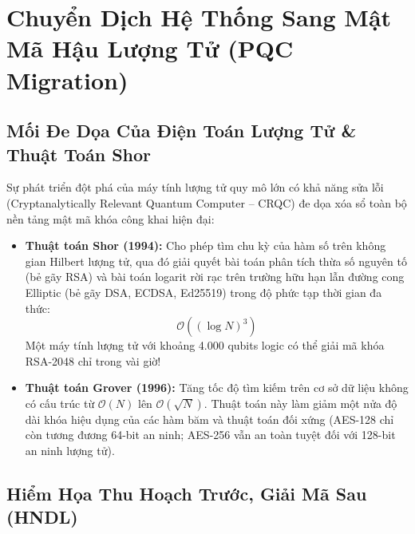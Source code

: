 \chapter{Chuyển Dịch Hệ Thống Sang Mật Mã Hậu Lượng Tử (PQC Migration)}


\section{Mối Đe Dọa Của Điện Toán Lượng Tử \& Thuật Toán Shor}

Sự phát triển đột phá của máy tính lượng tử quy mô lớn có khả năng sửa lỗi (Cryptanalytically Relevant Quantum Computer -- CRQC) đe dọa xóa sổ toàn bộ nền tảng mật mã khóa công khai hiện đại:
\begin{itemize}
  \item \textbf{Thuật toán Shor (1994):} Cho phép tìm chu kỳ của hàm số trên không gian Hilbert lượng tử, qua đó giải quyết bài toán phân tích thừa số nguyên tố (bẻ gãy RSA) và bài toán logarit rời rạc trên trường hữu hạn lẫn đường cong Elliptic (bẻ gãy DSA, ECDSA, Ed25519) trong độ phức tạp thời gian đa thức:
  \begin{equation}
  \mathcal{O}((\log N)^3)
  \end{equation}
  Một máy tính lượng tử với khoảng 4.000 qubits logic có thể giải mã khóa RSA-2048 chỉ trong vài giờ!
  \item \textbf{Thuật toán Grover (1996):} Tăng tốc độ tìm kiếm trên cơ sở dữ liệu không có cấu trúc từ $\mathcal{O}(N)$ lên $\mathcal{O}(\sqrt{N})$. Thuật toán này làm giảm một nửa độ dài khóa hiệu dụng của các hàm băm và thuật toán đối xứng (AES-128 chỉ còn tương đương 64-bit an ninh; AES-256 vẫn an toàn tuyệt đối với 128-bit an ninh lượng tử).
\end{itemize}

\section{Hiểm Họa Thu Hoạch Trước, Giải Mã Sau (HNDL)}

